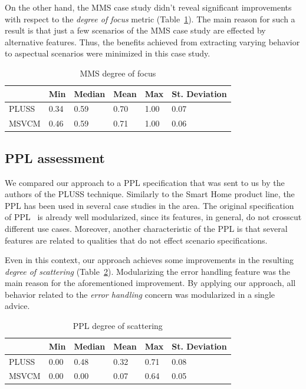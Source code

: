 \documentclass{sig-alternate}
\begin{document}
On the other hand, the MMS case study didn't reveal significant improvements with
respect to the \emph{degree of focus} metric (Table~\ref{tab:mms-dof}). The main reason for such a result is that just a few scenarios of the MMS case study are effected by alternative
features. Thus, the benefits achieved from extracting varying behavior to
aspectual scenarios were minimized in this case study.

\begin{table}[htb] \centering
\caption{MMS degree of focus}
\label{tab:mms-dof}
\begin{small}
\begin{tabular}{llllll} \hline
					& Min 	& Median 	& Mean 	& Max 	& St. Deviation \\ \hline 
	PLUSS			& 0.34	& 0.59		& 0.70	& 1.00	& 0.07			\\
	MSVCM			& 0.46  & 0.59   	& 0.71 	& 1.00 	& 0.06			\\ \hline	
\end{tabular}
\end{small}
\end{table}

\subsection{PPL assessment}

We compared our approach to a PPL specification that was sent to us by the
authors of the PLUSS technique. Similarly to the Smart Home product line, the PPL has been used in several case
studies in the area. The original specification of PPL~\cite{PPL:2008} is already well
modularized, since its features, in general, do not crosscut different
use cases. Moreover, another characteristic of the PPL is that several features
are related to qualities that do not effect scenario specifications.

Even in this context, our approach achieves some improvements in the
resulting \emph{degree of scattering} (Table~\ref{tab:ppl-dos}). Modularizing the error handling feature was the main reason for the
aforementioned improvement. By applying our approach, all behavior related to
the \emph{error handling} concern was modularized in a single advice. 

\begin{table}[htb] \centering
\caption{PPL degree of scattering}
\label{tab:ppl-dos}
\begin{small}
\begin{tabular}{llllll} \hline
					& Min 	& Median 	& Mean 	& Max 	& St. Deviation \\ \hline 
	PLUSS			& 0.00	& 0.48		& 0.32	& 0.71	& 0.08			\\
	MSVCM			& 0.00  & 0.00   	& 0.07 	& 0.64 	& 0.05			\\ \hline	
\end{tabular}
\end{small}
\end{table}
\end{document}
